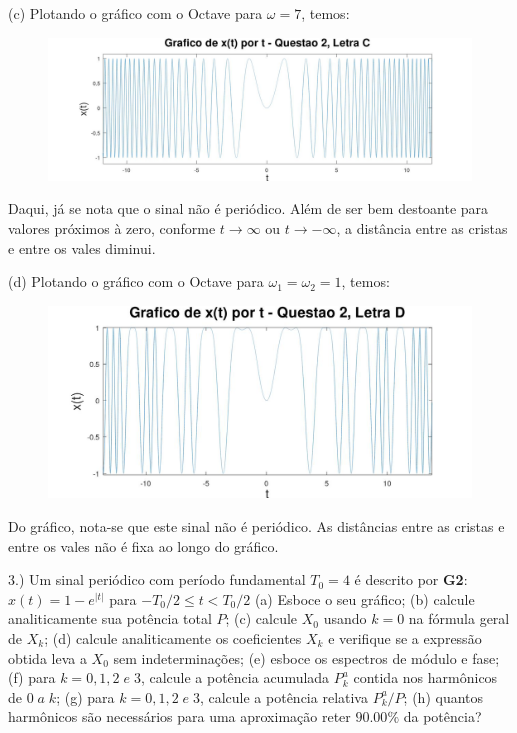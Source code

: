 \documentclass{article}
\begin{document}
(c) Plotando o gráfico com o Octave para $\omega = 7$, temos:
\begin{figure}[h!]
    \includegraphics[scale=0.2]{plot2c}
    \centering
\end{figure}

Daqui, já se nota que o sinal não é periódico. Além de ser bem destoante para valores próximos à zero, conforme $t \rightarrow \infty$ ou $t \rightarrow - \infty$, a distância entre as cristas e entre os vales diminui.

\vspace{\baselineskip}

(d) Plotando o gráfico com o Octave para $\omega_{1} = \omega_{2} = 1$, temos:
\begin{figure}[h!]
    \includegraphics[scale=0.25]{plot2d}
    \centering
\end{figure}

\vspace{\baselineskip}

Do gráfico, nota-se que este sinal não é periódico. As distâncias entre as cristas e entre os vales não é fixa ao longo do gráfico.

\vspace{\baselineskip}

3.) Um sinal periódico com período fundamental $T_{0} = 4 $ é descrito por \textbf{G2}: $x(t) = 1 - e^{|t|}$ para $-T_{0}/2 \leq t < T_{0} / 2$
(a) Esboce o seu gráfico;
(b) calcule analiticamente sua potência total $P$;
(c) calcule $X_{0}$ usando $k = 0$ na fórmula geral de $X_{k}$;
(d) calcule analiticamente os coeficientes $X_{k}$ e verifique se a expressão obtida leva a $X_{0}$ sem indeterminações;
(e) esboce os espectros de módulo e fase;
(f) para $k = 0, 1, 2\;e\;3$, calcule a potência acumulada $P_{k}^{a}$ contida nos harmônicos de $0\;a\;k$;
(g) para $k = 0, 1, 2\;e\;3$, calcule a potência relativa $P_{k}^{a}/P$;
(h) quantos harmônicos são necessários para uma aproximação reter $90.00\%$ da potência?
\end{document}
